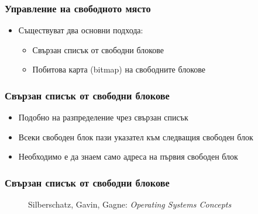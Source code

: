 \documentclass[ignorenonframetext, hyperref=unicode]{beamer}
\begin{document}
\begin{frame}
\frametitle{Управление на свободното място}
\begin{itemize}
  \item Съществуват два основни подхода:
  \begin{itemize}
		\item Свързан списък от свободни блокове
		\item Побитова карта (bitmap) на свободните блокове
  \end{itemize}
\end{itemize}
\end{frame}

\begin{frame}
\frametitle{Свързан списък от свободни блокове}
\begin{itemize}
  \item Подобно на разпределение чрез свързан списък
  \item Всеки свободен блок пази указател към следващия свободен блок
  \item Необходимо е да знаем само адреса на първия свободен блок
\end{itemize}
\end{frame}


\begin{frame}
\frametitle{Свързан списък от свободни блокове}
\begin{figure}[h]
\center
{}
\caption{Silberschatz, Gavin, Gagne: {\em Operating Systems Concepts}}
\end{figure}
\end{frame}
\end{document}
